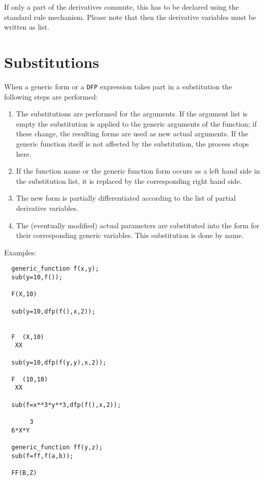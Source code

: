 If only a part of the derivatives commute, this has to be
declared using the standard {\REDUCE} rule mechanism. Please
note that then the derivative variables must be written as
list.

\section{Substitutions}

When a generic form or a {\tt DFP} expression takes part in a
substitution the following steps are performed:
\begin{enumerate}
\item The substitutions are performed for the arguments. If the
argument list is empty the substitution is applied to the
generic arguments of the function; if these change, the resulting
forms are used as new actual arguments.
If the generic function itself is not affected by the substitution,
the process stops here.
\item If the function name or the generic function
form occurs as a left hand side in the substitution list,
it is replaced by the corresponding right hand side.
\item The new form is partially differentiated according to the
list of partial derivative variables.
\item The (eventually modified) actual parameters are substituted
into the form for their corresponding generic variables.
This substitution is done by name.
\end{enumerate}

Examples:
\begin{verbatim}
  generic_function f(x,y);
  sub(y=10,f());

  F(X,10)

  sub(y=10,dfp(f(),x,2));


  F  (X,10)
   XX

  sub(y=10,dfp(f(y,y),x,2));

  F  (10,10)
   XX

  sub(f=x**3*y**3,dfp(f(),x,2));

       3
  6*X*Y

  generic_function ff(y,z);
  sub(f=ff,f(a,b));

  FF(B,Z)
\end{verbatim}

